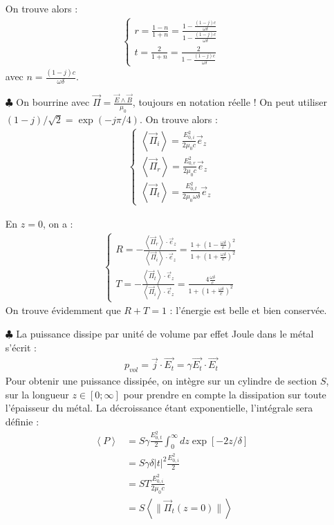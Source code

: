 \documentclass{report}
\begin{document}
\begin{itemize}
	On trouve alors :
	\begin{align}
    \begin{cases}
        r=\frac{1-n}{1+n}=\frac{1-\frac{(1-j)c}{\omega\delta}}{1-\frac{(1-j)c}{\omega\delta}}\\
     	t=\frac{2}{1+n}=\frac{2}{1-\frac{(1-j)c}{\omega\delta}}
    \end{cases}  
	\end{align}
	avec $n=\frac{(1-j)c}{\omega\delta}$. 
		
	\item[$\clubsuit$] On bourrine avec $\vec{\Pi}=\frac{\vec{E}\wedge\vec{B}}{\mu_0}$, toujours en notation réelle ! On peut utiliser $(1-j)/\sqrt{2}=\exp(-j\pi/4)$.
	On trouve alors :
	\begin{align}
    \begin{cases}
        \left\langle \vec{\Pi}_i\right\rangle =\frac{E_{0,i}^2}{2\mu_0c}\vec{e}_z\\
     	\left\langle \vec{\Pi}_r\right\rangle=\frac{E_{0,r}^2}{2\mu_0c}\vec{e}_z\\
     	\left\langle \vec{\Pi}_t\right\rangle= \frac{E_{0,t}^2}{2\mu_0\omega\delta}\vec{e}_z
     \end{cases}  
	\end{align}
	
	En $z=0$, on a :
	\begin{align}
    \begin{cases}
        R=-\frac{\left\langle \vec{\Pi}_r\right\rangle\cdot\vec{e}_z}{\left\langle \vec{\Pi}_i\right\rangle\cdot\vec{e}_z}=\frac{1+\left( 1-\frac{\omega\delta}{c}\right)^2}{1+\left(1+\frac{\omega\delta}{c}\right)^2}\\
     	T=-\frac{\left\langle \vec{\Pi}_t\right\rangle\cdot\vec{e}_z}{\left\langle \vec{\Pi}_i\right\rangle\cdot\vec{e}_z}=\frac{4\frac{\omega\delta}{c}}{1+\left(1+\frac{\omega\delta}{c}\right)^2}
    \end{cases}  
	\end{align}	
	On trouve évidemment que $R+T=1$ : l'énergie est belle et bien conservée. 
	
	\item[$\clubsuit$] La puissance dissipe par unité de volume par effet Joule dans le métal s'écrit :
	\begin{align*}
		p_{vol}=\vec{j}\cdot\vec{E_t}=\gamma\vec{E_t}\cdot\vec{E_t}
	\end{align*}
	Pour obtenir une puissance dissipée, on intègre sur un cylindre de section $S$, sur la longueur $z\in[0;\infty]$ pour prendre en compte la dissipation sur toute l'épaisseur du métal. La décroissance étant exponentielle, l'intégrale sera définie :
	\begin{align*}
		\left\langle P \right\rangle &= S\gamma\frac{E_{0,t}^2}{2}\int_0^\infty dz\exp[-2z/\delta] \\
		&= S\gamma\delta|t|^2\frac{E_{0,i}^2}{2} \\
		&= ST\frac{E_{0,i}^2}{2\mu_0 c} \\
		&=S\left\langle \parallel\vec{\Pi}_t(z=0)\parallel\right\rangle
	\end{align*}
	
\end{itemize}
\end{document}

